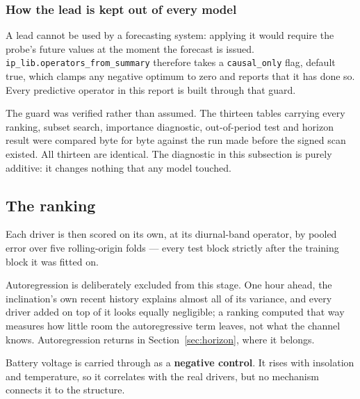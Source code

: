 \documentclass[11pt,a4paper]{article}
\begin{document}
\subsubsection*{How the lead is kept out of every model}

A lead cannot be used by a forecasting system: applying it would require the
probe's future values at the moment the forecast is issued.
\texttt{ip\_lib.operators\_from\_summary} therefore takes a
\texttt{causal\_only} flag, default true, which clamps any negative optimum to
zero and reports that it has done so. Every predictive operator in this report is
built through that guard.

The guard was verified rather than assumed. The thirteen tables carrying every
ranking, subset search, importance diagnostic, out-of-period test and horizon
result were compared byte for byte against the run made before the signed scan
existed. All thirteen are identical. The diagnostic in this subsection is purely
additive: it changes nothing that any model touched.

\subsection{The ranking}

Each driver is then scored on its own, at its diurnal-band operator, by pooled
error over five rolling-origin folds --- every test block strictly after the
training block it was fitted on.

Autoregression is deliberately excluded from this stage. One hour ahead, the
inclination's own recent history explains almost all of its variance, and every
driver added on top of it looks equally negligible; a ranking computed that way
measures how little room the autoregressive term leaves, not what the channel
knows. Autoregression returns in Section~\ref{sec:horizon}, where it belongs.

Battery voltage is carried through as a \textbf{negative control}. It rises with
insolation and temperature, so it correlates with the real drivers, but no
mechanism connects it to the structure.
\end{document}

